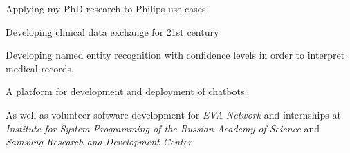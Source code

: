 \documentclass[10pt,a4paper,ragged2e,academicons]{altacv}
\begin{document}

\begin{fullwidth}
\makecvheader
\end{fullwidth}




Applying my PhD research to Philips use cases

\smallskip


Developing clinical data exchange for 21st century

\smallskip


Developing named entity recognition with confidence levels in order to interpret medical records.

\smallskip


A platform for development and deployment of chatbots.

\smallskip

As well as volunteer software development for \emph{EVA Network} and internships at \emph{Institute for System Programming of the Russian Academy of Science} and \emph{Samsung Research and Development Center}
\end{document}

